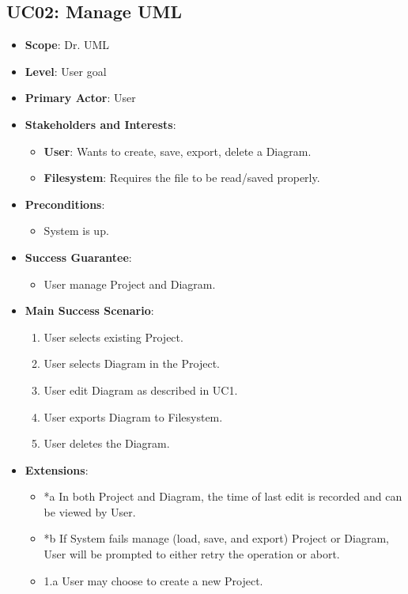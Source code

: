 \documentclass[12pt]{article}
\begin{document}
\subsection{UC02: Manage UML}
\begin{itemize}
    \item \textbf{Scope}: Dr. UML
    \item \textbf{Level}: User goal
    \item \textbf{Primary Actor}: User
    \item \textbf{Stakeholders and Interests}:
    \begin{itemize}
        \item \textbf{User}: Wants to create, save, export, delete a Diagram.
        \item \textbf{Filesystem}: Requires the file to be read/saved properly.
    \end{itemize}
    \item \textbf{Preconditions}:
    \begin{itemize}
        \item System is up.
    \end{itemize}
    \item \textbf{Success Guarantee}: 
    \begin{itemize}
        \item User manage Project and Diagram. 
    \end{itemize}
    \item \textbf{Main Success Scenario}:
    \begin{enumerate}
        \item User selects existing Project.
        \item User selects Diagram in the Project.
        \item User edit Diagram as described in UC1.
        \item User exports Diagram to Filesystem.
        \item User deletes the Diagram.
    \end{enumerate}
    \item \textbf{Extensions}:
    \begin{itemize}
        \item *a In both Project and Diagram, the time of last edit is recorded and can be viewed by User.
        \item *b If System fails manage (load, save, and export) Project or Diagram, User will be prompted to either retry the operation or abort.
        \item 1.a User may choose to create a new Project.

\end{itemize}
\end{itemize}
\end{document}
